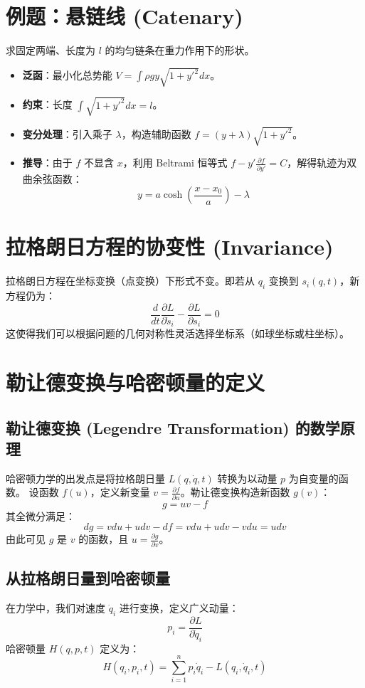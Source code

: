 \documentclass[11pt,a4paper]{article}
\begin{document}
\section{例题：悬链线 (Catenary)}
求固定两端、长度为 $l$ 的均匀链条在重力作用下的形状。
\begin{itemize}
    \item \textbf{泛函}：最小化总势能 $V = \int \rho g y \sqrt{1+y'^2} dx$。
    \item \textbf{约束}：长度 $\int \sqrt{1+y'^2} dx = l$。
    \item \textbf{变分处理}：引入乘子 $\lambda$，构造辅助函数 $f = (y+\lambda)\sqrt{1+y'^2}$。
    \item \textbf{推导}：由于 $f$ 不显含 $x$，利用 Beltrami 恒等式 $f - y' \frac{\partial f}{\partial y'} = C$，解得轨迹为双曲余弦函数：
    \[ y = a \cosh\left(\frac{x-x_0}{a}\right) - \lambda \]
\end{itemize}

\section{拉格朗日方程的协变性 (Invariance)}
拉格朗日方程在坐标变换（点变换）下形式不变。即若从 $q_i$ 变换到 $s_i(q, t)$，新方程仍为：
\[ \frac{d}{dt}\frac{\partial L}{\partial\dot{s}_{i}}-\frac{\partial L}{\partial s_{i}}=0 \]
这使得我们可以根据问题的几何对称性灵活选择坐标系（如球坐标或柱坐标）。

\section{勒让德变换与哈密顿量的定义}

\subsection{勒让德变换 (Legendre Transformation) 的数学原理}
哈密顿力学的出发点是将拉格朗日量 $L(q, \dot{q}, t)$ 转换为以动量 $p$ 为自变量的函数。
设函数 $f(u)$，定义新变量 $v = \frac{\partial f}{\partial u}$。勒让德变换构造新函数 $g(v)$：
\[ g = uv - f \]
其全微分满足：
\[ dg = v du + u dv - df = v du + u dv - v du = u dv \]
由此可见 $g$ 是 $v$ 的函数，且 $u = \frac{\partial g}{\partial v}$。

\subsection{从拉格朗日量到哈密顿量}
在力学中，我们对速度 $\dot{q}_i$ 进行变换，定义广义动量：
\[ p_i = \frac{\partial L}{\partial \dot{q}_i} \]
哈密顿量 $H(q, p, t)$ 定义为：
\[ H(q_i, p_i, t) = \sum_{i=1}^{n} p_i \dot{q}_i - L(q_i, \dot{q}_i, t) \]
\end{document}
